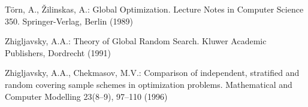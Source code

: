 \documentclass[smallextended]{svjour3}
\begin{document}
\begin{thebibliography}{}
Törn, A., Žilinskas, A.: Global Optimization. Lecture Notes in Computer Science 350. Springer-Verlag, Berlin (1989)

Zhigljavsky, A.A.: Theory of Global Random Search. Kluwer Academic Publishers, Dordrecht (1991)

Zhigljavsky, A.A., Chekmasov, M.V.: Comparison of independent, stratified and random covering sample schemes in optimization problems. Mathematical  and Computer Modelling  23(8--9), 97--110 (1996)
\end{thebibliography}
\end{document}
